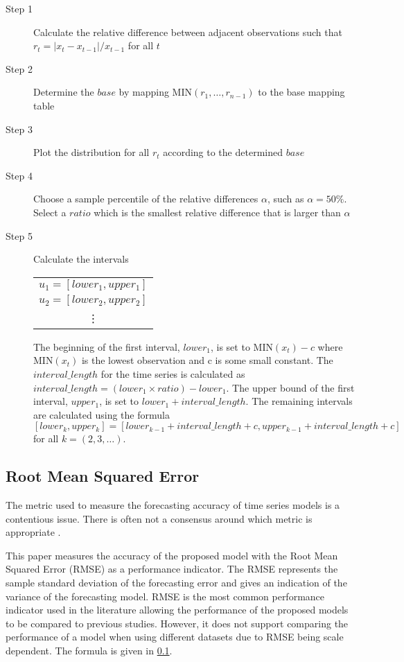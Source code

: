 \documentclass[12pt, oneside, a4paper]{article}
\theoremstyle{definition}
\begin{document}
\begin{description}
\item[Step 1] Calculate the relative difference between adjacent observations such that $r_t=|x_t-x_{t-1}|/x_{t-1}$ for all $t$
\item[Step 2] Determine the $base$ by mapping MIN$(r_1,\ldots,r_{n-1})$ to the base mapping table
\item[Step 3] Plot the distribution for all $r_t$ according to the determined $base$
\item[Step 4] Choose a sample percentile of the relative differences $\alpha$, such as $\alpha=50\%$. Select a $ratio$ which is the smallest relative difference that is larger than $\alpha$
\item[Step 5] Calculate the intervals 

\begin{table}[H]
	\center
	\begin{tabular}{ c }
		\hline
	  	$u_1 = [lower_1, upper_1]$ \\
	  	$u_2 = [lower_2, upper_2]$ \\
	  	\vdots \\
	  	\hline
	\end{tabular}
\end{table}

The beginning of the first interval, $lower_1$, is set to MIN$(x_t)-c$ where MIN$(x_t)$ is the lowest observation and c is some small constant. The $interval\_length$ for the time series is calculated as $interval\_length=(lower_1 \times ratio) - lower_1$. The upper bound of the first interval, $upper_1$, is set to $lower_1 + interval\_length$. The remaining intervals are calculated using the formula $[lower_k,upper_k]=[lower_{k-1}+interval\_length+c, upper_{k-1}+interval\_length+c]$ for all $k=(2,3,\ldots)$.
\end{description}

\subsection{Root Mean Squared Error}

\label{rmse}

The metric used to measure the forecasting accuracy of time series models is a contentious issue. There is often not a consensus around which metric is appropriate \citep{hyndman2006another}.

This paper measures the accuracy of the proposed model with the Root Mean Squared Error (RMSE) as a performance indicator. The RMSE represents the sample standard deviation of the forecasting error and gives an indication of the variance of the forecasting model. RMSE is the most common performance indicator used in the literature allowing the performance of the proposed models to be compared to previous studies. However, it does not support comparing the performance of a model when using different datasets due to RMSE being scale dependent. The formula is given in \cref{rmse}.
\end{document}
